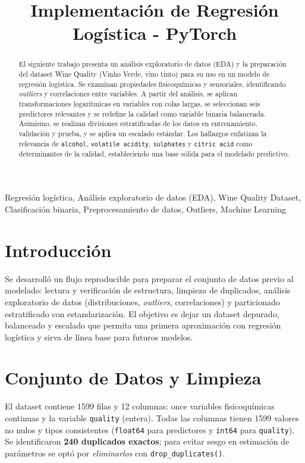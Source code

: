 \documentclass[conference]{IEEEtran}
\title{Implementación de Regresión Logística - PyTorch\vspace{-0.35em}}
\author{\IEEEauthorblockN{Priscilla Jim\'enez Salgado, Fabi\'an Araya Ortega, David Acu\~na L\'opez}
\IEEEauthorblockA{Curso de Inteligencia Artificial, Escuela de Ingenier\'ia en Computaci\'on, Tecnol\'ogico de Costa Rica (TEC)\\}}
\begin{document}
\raggedbottom
\maketitle

\begin{abstract}
El siguiente trabajo presenta un análisis exploratorio de datos (EDA) y la preparación del dataset Wine Quality (Vinho Verde, vino tinto) para su uso en un modelo de regresión logística. Se examinan propiedades fisicoquímicas y sensoriales, identificando \emph{outliers} y correlaciones entre variables. A partir del análisis, se aplican transformaciones logarítmicas en variables con colas largas, se seleccionan seis predictores relevantes y se redefine la calidad como variable binaria balanceada. Asimismo, se realizan divisiones estratificadas de los datos en entrenamiento, validación y prueba, y se aplica un escalado estándar. Los hallazgos enfatizan la relevancia de \texttt{alcohol}, \texttt{volatile acidity}, \texttt{sulphates} y \texttt{citric acid} como determinantes de la calidad, estableciendo una base sólida para el modelado predictivo.
\end{abstract}

\begin{IEEEkeywords}
Regresión logística, Análisis exploratorio de datos (EDA), Wine Quality Dataset, Clasificación binaria, Preprocesamiento de datos, Outliers, Machine Learning
\end{IEEEkeywords}

\section{Introducci\'on}
Se desarrolló un flujo reproducible para preparar el conjunto de datos previo al modelado: lectura y verificación de estructura, limpieza de duplicados, análisis exploratorio de datos (distribuciones, \emph{outliers}, correlaciones) y particionado estratificado con estandarización. El objetivo es dejar un dataset depurado, balanceado y escalado que permita una primera aproximación con regresión logística y sirva de línea base para futuros modelos.

\section{Conjunto de Datos y Limpieza}
El dataset contiene \num{1599} filas y \num{12} columnas: once variables fisicoquímicas continuas y la variable \texttt{quality} (entera). Todas las columnas tienen 1599 valores no nulos y tipos consistentes (\texttt{float64} para predictores y \texttt{int64} para \texttt{quality}). Se identificaron \textbf{240 duplicados exactos}; para evitar sesgo en estimación de parámetros se optó por \emph{eliminarlos} con \texttt{drop\_duplicates()}.
\end{document}
